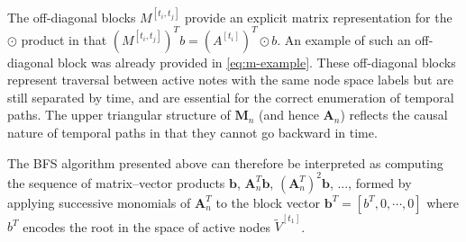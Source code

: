 \documentclass[10pt,conference,compsocconf]{IEEEtran}
\theoremstyle{definition}
\begin{document}
The off-diagonal blocks $M^{[t_i, t_j]}$ provide an explicit matrix representation
for the $\odot$ product in that $(M^{[t_i, t_j]})^T b = (A^{[t_i]})^T \odot b$.
An example of such an off-diagonal block was already provided in \eqref{eq:m-example}.
These off-diagonal blocks represent traversal between active notes with the same
node space labels but are still separated by time, and are essential for
the correct enumeration of temporal paths.
The upper triangular structure of $\bm M_n$ (and hence $\bm A_n$) reflects the causal
nature of temporal paths in that they cannot go backward in time.

The BFS algorithm presented above can therefore be interpreted as
computing the sequence of matrix--vector products $\bm b$, $\bm A_n^T \bm b$,
$(\bm A_n^T)^2 \bm b$, ..., formed by applying successive monomials of $\bm A_n^T$ to the
block vector
$\bm b^T = [b^T, 0, \cdots, 0 ]$
where $b^T$ encodes the root in the space of active nodes $\tilde V^{[t_1]}$.
\end{document}
